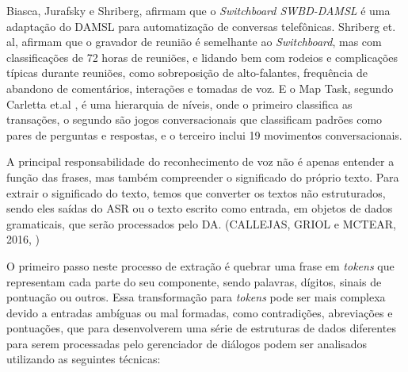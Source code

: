 \documentclass[
	12pt,				%
	oneside,
	a4paper,			%
	english,			%
	french,				%
	spanish,			%
	brazil				%
	]{abntex2}
\begin{document}
Biasca, Jurafsky e Shriberg\supercite{dasml-switchboard}, afirmam que o \emph{Switchboard SWBD-DAMSL} é uma adaptação do DAMSL para automatização de conversas telefônicas. Shriberg\supercite{shriberg-etal-2004-icsi} et. al, afirmam que o gravador de reunião é semelhante ao \emph{Switchboard}, mas com classificações de 72 horas de reuniões, e lidando bem com rodeios e complicações típicas durante reuniões, como sobreposição de alto-falantes, frequência de abandono de comentários, interações e tomadas de voz. E o Map Task, segundo Carletta et.al \supercite{map-task}, é uma hierarquia de níveis, onde o primeiro classifica as transações, o segundo são jogos conversacionais que classificam padrões como pares de perguntas e respostas, e o terceiro inclui 19 movimentos conversacionais.

A principal responsabilidade do reconhecimento de voz não é apenas entender a função das frases, mas também compreender o significado do próprio texto.
Para extrair o significado do texto, temos que converter os textos não estruturados, sendo eles saídas do ASR ou o texto escrito como entrada, em objetos de dados gramaticais, que serão processados pelo DA. 
(CALLEJAS, GRIOL e MCTEAR, 2016, \cite{conversational-interface})

O primeiro passo neste processo de extração é quebrar uma frase em \emph{tokens} que representam cada parte do seu componente, sendo palavras, dígitos, sinais de pontuação ou outros. Essa transformação para \emph{tokens} pode ser mais complexa devido a entradas ambíguas ou mal formadas, como contradições, abreviações e pontuações, que para desenvolverem uma série de estruturas de dados diferentes para serem processadas pelo gerenciador de diálogos podem ser analisados utilizando as seguintes técnicas:
\end{document}
